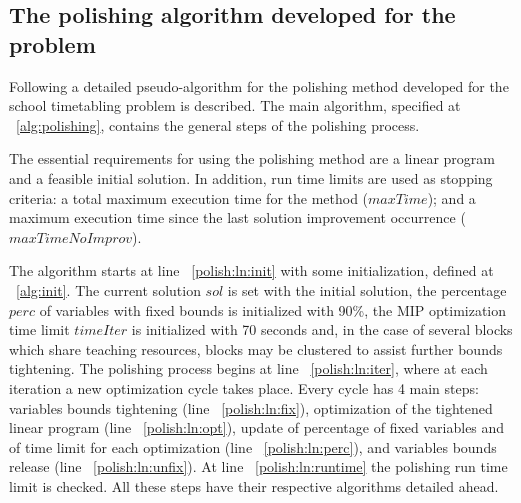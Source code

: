 \subsection{The polishing algorithm developed for the problem}

Following a detailed pseudo-algorithm for the polishing method developed for the school timetabling problem is described. The main algorithm, specified at ~\ref{alg:polishing}, contains the general steps of the polishing process.

The essential requirements for using the polishing method are a linear program and a feasible initial solution. In addition, run time limits are used as stopping criteria: a total maximum execution time for the method ($maxTime$); and a maximum execution time since the last solution improvement occurrence ($maxTimeNoImprov$).

The algorithm starts at line ~\ref{polish:ln:init} with some initialization, defined at ~\ref{alg:init}. The current solution $sol$ is set with the initial solution, the percentage $perc$ of variables with fixed bounds is initialized with 90\%, the MIP optimization time limit $timeIter$ is initialized with 70 seconds and, in the case of several blocks which share teaching resources, blocks may be clustered to assist further bounds tightening. The polishing process begins at line ~\ref{polish:ln:iter}, where at each iteration a new optimization cycle takes place. Every cycle has 4 main steps: variables bounds tightening (line ~\ref{polish:ln:fix}), optimization of the tightened linear program (line ~\ref{polish:ln:opt}), update of percentage of fixed variables and of time limit for each optimization (line ~\ref{polish:ln:perc}), and variables bounds release (line ~\ref{polish:ln:unfix}). At line ~\ref{polish:ln:runtime} the polishing run time limit is checked. All these steps have their respective algorithms detailed ahead.


